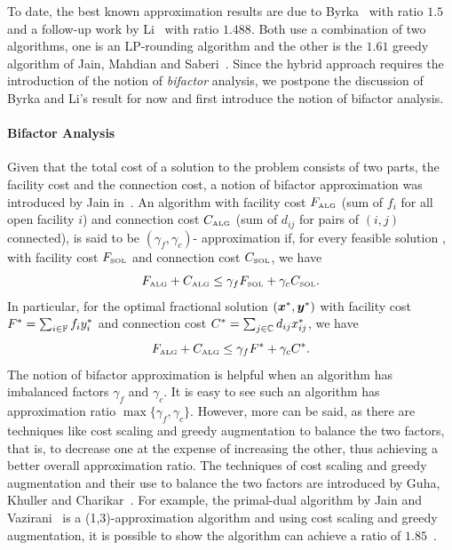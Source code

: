 \documentclass[oneside,final]{ucr}
\begin{document}
To date, the best known approximation results are due to
Byrka~\cite{Byrka07} with ratio $1.5$ and a follow-up work
by Li~\cite{Li11} with ratio $1.488$. Both use a combination
of two algorithms, one is an LP-rounding algorithm and the
other is the $1.61$ greedy algorithm of Jain, Mahdian and
Saberi~\cite{JainMS02}. Since the hybrid approach requires
the introduction of the notion of \emph{bifactor} analysis,
we postpone the discussion of Byrka and Li's result for now
and first introduce the notion of bifactor analysis.

\paragraph{Bifactor Analysis}
Given that the total cost of a solution to the {\UFL}
problem consists of two parts, the facility cost and the
connection cost, a notion of bifactor approximation was
introduced by Jain {\etal} in~\cite{JainMMSV03}. An
algorithm with facility cost $F_{\mbox{\tiny\rm ALG}}$ (sum of $f_i$
for all open facility $i$) and connection cost
$C_{\mbox{\tiny\rm ALG}}$ (sum of $d_{ij}$ for pairs of $(i,j)$
connected), is said to be $(\gamma_f,\gamma_c)$-
approximation if, for every feasible solution {\SOL}, with
facility cost $F_{{{\mbox{\tiny\rm SOL}}}}$ and connection cost
$C_{{{\mbox{\tiny\rm SOL}}}}$, we have
\begin{equation*}
  F_{\mbox{\tiny\rm ALG}} + C_{\mbox{\tiny\rm ALG}} \leq \gamma_f F_{{{\mbox{\tiny\rm SOL}}}} +
  \gamma_c C_{{{\mbox{\tiny\rm SOL}}}}.
\end{equation*}
In particular, for the optimal fractional solution
$(\boldsymbol{x}^\ast,\boldsymbol{y}^\ast)$ with facility cost $F^\ast =
\sum_{i\in\mathbb{F}} f_i y_i^\ast$ and connection cost
$C^\ast = \sum_{j\in\mathbb{C}} d_{ij} x_{ij}^\ast$, we have
\begin{equation*}
  F_{\mbox{\tiny\rm ALG}} + C_{\mbox{\tiny\rm ALG}} \leq \gamma_f F^\ast +
  \gamma_c C^\ast.
\end{equation*}
The notion of bifactor approximation is helpful when an
algorithm has imbalanced factors $\gamma_f$ and
$\gamma_c$. It is easy to see such an algorithm has
approximation ratio $\max\{\gamma_f, \gamma_c\}$. However,
more can be said, as there are techniques like cost scaling
and greedy augmentation to balance the two factors, that is,
to decrease one at the expense of increasing the other, thus
achieving a better overall approximation ratio. The
techniques of cost scaling and greedy augmentation and their
use to balance the two factors are introduced by Guha,
Khuller and Charikar~\cite{GuhaK98, CharikarG05}. For
example, the primal-dual algorithm by Jain and
Vazirani~\cite{JainV03} is a (1,3)-approximation algorithm
and using cost scaling and greedy augmentation, it is
possible to show the algorithm can achieve a ratio of
$1.85$~\cite{CharikarG05}.
\end{document}
